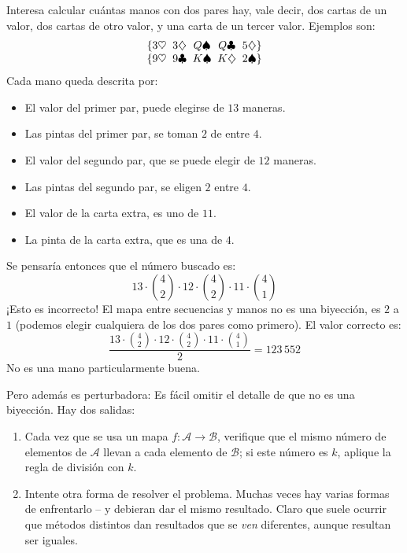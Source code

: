   Interesa calcular cuántas manos con dos pares hay,
  vale decir,
  dos cartas de un valor,
  dos cartas de otro valor,
  y una carta de un tercer valor.
  Ejemplos son:
  \begin{align*}
    \begin{array}{@{\{}*{4}{c@{\;\;}}c@{\}}}
      3 \heartsuit & 3 \diamondsuit & Q \spadesuit & Q \clubsuit
	 & 5 \diamondsuit \\
      9 \heartsuit & 9 \clubsuit    & K \spadesuit & K \diamondsuit
	 & 2 \spadesuit
    \end{array}
  \end{align*}
  Cada mano queda descrita por:
  \begin{itemize}
  \item
    El valor del primer par,
    puede elegirse de \(13\) maneras.
  \item
    Las pintas del primer par,
    se toman \(2\) de entre \(4\).
  \item
    El valor del segundo par,
    que se puede elegir de \(12\) maneras.
  \item
    Las pintas del segundo par,
    se eligen \(2\) entre \(4\).
  \item
    El valor de la carta extra,
    es uno de \(11\).
  \item
    La pinta de la carta extra,
    que es una de \(4\).
  \end{itemize}
  Se pensaría entonces que el número buscado es:
  \begin{equation*}
    13 \cdot \binom{4}{2} \cdot 12 \cdot \binom{4}{2}
     \cdot 11 \cdot \binom{4}{1}
  \end{equation*}
  ¡Esto es incorrecto!
  El mapa entre secuencias y manos no es una biyección,
  es \(2\) a \(1\)
  (podemos elegir cualquiera de los dos pares como primero).
  El valor correcto es:
  \begin{equation*}
    \frac{13 \cdot \binom{4}{2} \cdot 12 \cdot \binom{4}{2}
	    \cdot 11 \cdot \binom{4}{1}}{2}
      = 123\,552
  \end{equation*}
  No es una mano particularmente buena.

  Pero además es perturbadora:
  Es fácil omitir el detalle de que no es una biyección.
  Hay dos salidas:
  \begin{enumerate}
  \item
    Cada vez que se usa
    un mapa \(f \colon \mathcal{A} \rightarrow \mathcal{B}\),
    verifique que el mismo número de elementos de \(\mathcal{A}\)
    llevan a cada elemento de \(\mathcal{B}\);
    si este número es \(k\),
    aplique la regla de división con \(k\).%
  \item
    Intente otra forma de resolver el problema.
    Muchas veces hay varias formas de enfrentarlo --
    y debieran dar el mismo resultado.
    Claro que suele ocurrir que métodos distintos
    dan resultados que se \emph{ven} diferentes,
    aunque resultan ser iguales.
  \end{enumerate}

